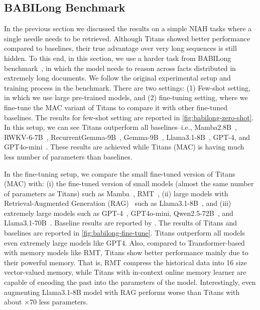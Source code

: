 \documentclass{article}
\newcommand{\citep}{\parencite}
\begin{document}
\subsection{BABILong Benchmark}\label{sec:exp-babilong}
In the previous section we discussed the results on a simple NIAH tasks where a single needle needs to be retrieved. Although Titans showed better performance compared to baselines, their true advantage over very long sequences is still hidden. To this end, in this section, we use a harder task from BABILong benchmark~\citep{kuratov2024babilong}, in which the model needs to reason across facts distributed in extremely long documents. We follow the original experimental setup and training process in the benchmark. There are two settings: (1) Few-shot setting, in which we use large pre-trained models, and (2) fine-tuning setting, where we fine-tune the MAC variant of Titans to compare it with other fine-tuned baselines. The results for few-shot setting are reported in \autoref{fig:babilong-zero-shot}. In this setup, we can see Titans outperform all baselines–i.e., Mamba2.8B~\citep{gu2024mamba}, RWKV-6-7B~\citep{peng2024eagle}, RecurrentGemma-9B~\citep{botev2024recurrentgemma}, Gemma-9B~\citep{team2024gemma}, Llama3.1-8B~\citep{touvron2023llama}, GPT-4, and GPT4o-mini~\citep{achiam2023gpt}. These results are achieved while Titans (MAC) is having much less number of parameters than baselines. 

In the fine-tuning setup, we compare the small fine-tuned version of Titans (MAC) with: (i) the fine-tuned version of small models (almost the same number of parameters as Titans) such as Mamba~\citep{gu2024mamba}, RMT~\citep{bulatov2022recurrent}, (ii) large models with Retrieval-Augmented Generation (RAG)~\citep{lewis2020retrieval} such as Llama3.1-8B~\citep{touvron2023llama}, and (iii) extremely large models such as GPT-4~\citep{achiam2023gpt}, GPT4o-mini, Qwen2.5-72B~\citep{yang2024qwen2}, and Llama3.1-70B~\citep{touvron2023llama}. Baseline results are reported by \citep{kuratov2024babilong}. The results of Titans and baselines are reported in \autoref{fig:babilong-fine-tune}. Titans outperform all models even extremely large models like GPT4. Also, compared to Transformer-based with memory models like RMT, Titans show better performance mainly due to their powerful memory. That is, RMT compress the historical data into 16 size vector-valued memory, while Titans with in-context online memory learner are capable of encoding the past into the parameters of the model. Interestingly, even augmenting Llama3.1-8B model with RAG performs worse than Titans with about $\times$70 less parameters.       
\end{document}
